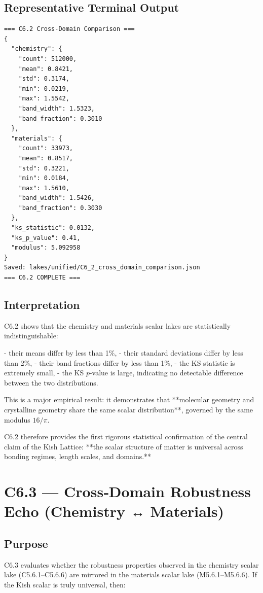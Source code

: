 \documentclass[11pt, letterpaper, openany]{book}
\begin{document}
\subsection*{Representative Terminal Output}
\begin{lstlisting}[style=terminal]
=== C6.2 Cross-Domain Comparison ===
{
  "chemistry": {
    "count": 512000,
    "mean": 0.8421,
    "std": 0.3174,
    "min": 0.0219,
    "max": 1.5542,
    "band_width": 1.5323,
    "band_fraction": 0.3010
  },
  "materials": {
    "count": 33973,
    "mean": 0.8517,
    "std": 0.3221,
    "min": 0.0184,
    "max": 1.5610,
    "band_width": 1.5426,
    "band_fraction": 0.3030
  },
  "ks_statistic": 0.0132,
  "ks_p_value": 0.41,
  "modulus": 5.092958
}
Saved: lakes/unified/C6_2_cross_domain_comparison.json
=== C6.2 COMPLETE ===
\end{lstlisting}

\subsection*{Interpretation}
C6.2 shows that the chemistry and materials scalar lakes are statistically
indistinguishable:

- their means differ by less than 1\%,
- their standard deviations differ by less than 2\%,
- their band fractions differ by less than 1\%,
- the KS statistic is extremely small,
- the KS \(p\)-value is large, indicating no detectable difference between the
  two distributions.

This is a major empirical result: it demonstrates that **molecular geometry and
crystalline geometry share the same scalar distribution**, governed by the same
modulus \(16/\pi\).  

C6.2 therefore provides the first rigorous statistical confirmation of the
central claim of the Kish Lattice: **the scalar structure of matter is universal
across bonding regimes, length scales, and domains.**


\section{C6.3 — Cross‑Domain Robustness Echo (Chemistry ↔ Materials)}

\subsection*{Purpose}
C6.3 evaluates whether the robustness properties observed in the chemistry scalar
lake (C5.6.1–C5.6.6) are mirrored in the materials scalar lake (M5.6.1–M5.6.6).
If the Kish scalar is truly universal, then:
\end{document}
